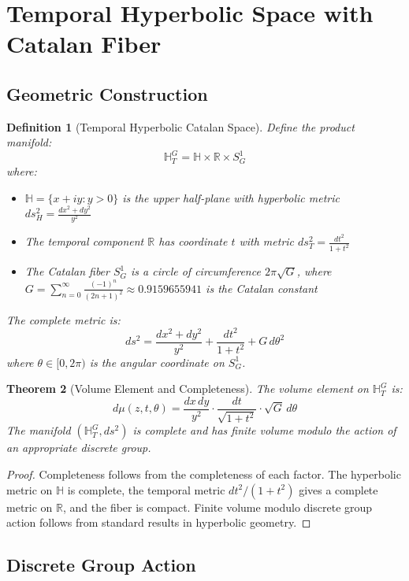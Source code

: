 \documentclass[11pt]{article}
\theoremstyle{plain}
\newtheorem{theorem}{Theorem}[section]
\newtheorem{definition}[theorem]{Definition}
\theoremstyle{remark}
\newcommand{\R}{\mathbb{R}}
\newcommand{\H}{\mathbb{H}}
\newcommand{\Catalan}{G}
\begin{document}
\section{Temporal Hyperbolic Space with Catalan Fiber}

\subsection{Geometric Construction}

\begin{definition}[Temporal Hyperbolic Catalan Space]
Define the product manifold:
\[
\H_T^{\Catalan} = \H \times \R \times S^1_{\Catalan}
\]
where:
\begin{itemize}
\item $\H = \{x + iy : y > 0\}$ is the upper half-plane with hyperbolic metric $ds_H^2 = \frac{dx^2 + dy^2}{y^2}$
\item The temporal component $\R$ has coordinate $t$ with metric $ds_T^2 = \frac{dt^2}{1+t^2}$
\item The Catalan fiber $S^1_{\Catalan}$ is a circle of circumference $2\pi\sqrt{\Catalan}$, where $\Catalan = \sum_{n=0}^\infty \frac{(-1)^n}{(2n+1)^2} \approx 0.9159655941$ is the Catalan constant
\end{itemize}
The complete metric is:
\[
ds^2 = \frac{dx^2 + dy^2}{y^2} + \frac{dt^2}{1+t^2} + \Catalan\, d\theta^2
\]
where $\theta \in [0, 2\pi)$ is the angular coordinate on $S^1_{\Catalan}$.
\end{definition}

\begin{theorem}[Volume Element and Completeness]
The volume element on $\H_T^{\Catalan}$ is:
\[
d\mu(z,t,\theta) = \frac{dx\,dy}{y^2} \cdot \frac{dt}{\sqrt{1+t^2}} \cdot \sqrt{\Catalan}\, d\theta
\]
The manifold $(\H_T^{\Catalan}, ds^2)$ is complete and has finite volume modulo the action of an appropriate discrete group.
\end{theorem}

\begin{proof}
Completeness follows from the completeness of each factor. The hyperbolic metric on $\H$ is complete, the temporal metric $dt^2/(1+t^2)$ gives a complete metric on $\R$, and the fiber is compact. Finite volume modulo discrete group action follows from standard results in hyperbolic geometry.
\end{proof}

\subsection{Discrete Group Action}
\end{document}
